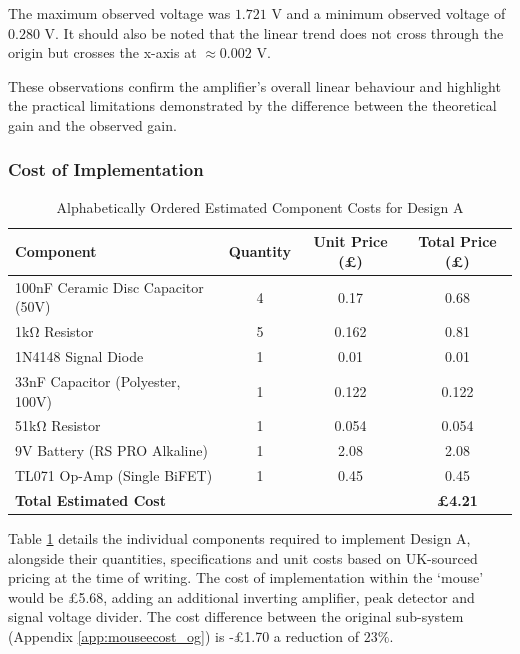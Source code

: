 The maximum observed voltage was \(1.721\) V and a minimum observed voltage of \(0.280\) V. It should also be noted that the linear trend does not cross through the origin but crosses the x-axis at \(\approx0.002\) V.

These observations confirm the amplifier's overall linear behaviour and highlight the practical limitations demonstrated by the difference between the theoretical gain and the observed gain.

\subsubsection{Cost of Implementation}
\begin{table}[H]
    \centering
    \caption{Alphabetically Ordered Estimated Component Costs for Design A}
    \begin{tabular}{|l|c|c|c|}
    \hline
    \textbf{Component} & \textbf{Quantity} & \textbf{Unit Price (£)} & \textbf{Total Price (£)} \\ \hline\hline
    100nF Ceramic Disc Capacitor (50V) \cite{rs_100nfcap} & 4 & 0.17& 0.68\\ \hline
    1kΩ Resistor \cite{rs_1kresistor} & 5 & 0.162& 0.81\\ \hline
    1N4148 Signal Diode \cite{rs_1n4148} & 1 & 0.01& 0.01\\ \hline
    33nF Capacitor (Polyester, 100V) \cite{rs_33nfcap} & 1 & 0.122& 0.122\\ \hline
    51kΩ Resistor \cite{rs_51kresistor} & 1 & 0.054& 0.054\\ \hline
    9V Battery (RS PRO Alkaline) \cite{rs_9vbattery} & 1 & 2.08& 2.08\\ \hline
    TL071 Op-Amp (Single BiFET) \cite{rs_tl071} & 1 & 0.45& 0.45\\ \hline\hline
    \textbf{Total Estimated Cost} &&&\textbf{£4.21}\\ \hline
    \end{tabular}
    \label{tab:component_info_da}
\end{table}

Table \ref{tab:component_info_da} details the individual components required to implement Design A, alongside their quantities, specifications and unit costs based on UK-sourced pricing at the time of writing. The cost of implementation within the `mouse' would be £5.68, adding an additional inverting amplifier, peak detector and signal voltage divider. The cost difference between the original sub-system (Appendix \ref{app:mouseecost_og}) is -£1.70 a reduction of \(23\%\).


